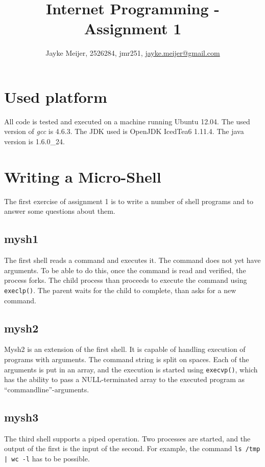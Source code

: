 \documentclass[a4paper]{article}
\title{Internet Programming - Assignment 1}
\author{Jayke Meijer, 2526284, jmr251, \url{jayke.meijer@gmail.com}}
\begin{document}
\maketitle

\tableofcontents
\pagebreak

\section{Used platform}

All code is tested and executed on a machine running Ubuntu 12.04. The used version of
\emph{gcc} is 4.6.3. The JDK used is OpenJDK IcedTea6 1.11.4. The java version is
1.6.0\_24.

\section{Writing a Micro-Shell}

The first exercise of assignment 1 is to write a number of shell programs and to answer
some questions about them.

\subsection{mysh1}

The first shell reads a command and executes it. The command does not yet have arguments.
To be able to do this, once the command is read and verified, the process forks. The child
process than proceeds to execute the command using \texttt{execlp()}. The parent waits for
the child to complete, than asks for a new command.

\subsection{mysh2}

Mysh2 is an extension of the first shell. It is capable of handling execution of programs
with arguments. The command string is split on spaces. Each of the arguments is put in an
array, and the execution is started using \texttt{execvp()}, which has the ability to pass
a NULL-terminated array to the executed program as ``commandline''-arguments.

\subsection{mysh3}

The third shell supports a piped operation. Two processes are started, and the output of
the first is the input of the second. For example, the command \texttt{ls /tmp | wc -l} 
has to be possible.
\end{document}
